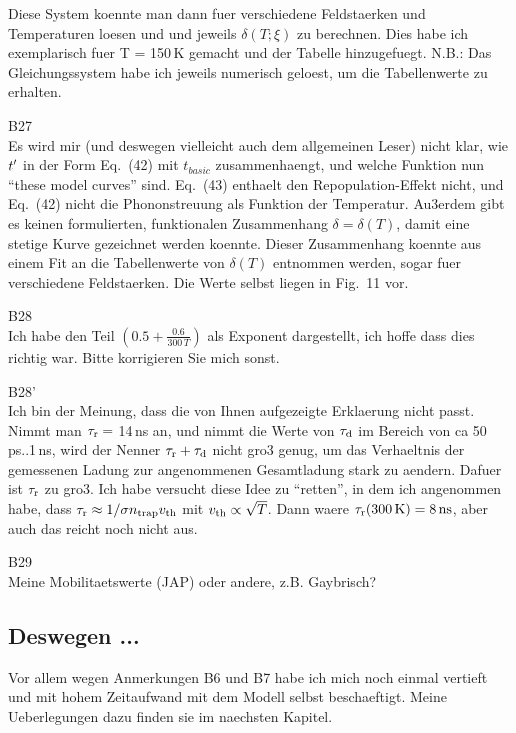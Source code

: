 \noindent
Diese System koennte man dann fuer verschiedene Feldstaerken und Temperaturen loesen und und jeweils $\delta(T;\xi)$ zu berechnen. 
Dies habe ich exemplarisch fuer T = 150\,K gemacht und der Tabelle hinzugefuegt. 
N.B.: Das Gleichungssystem habe ich jeweils numerisch geloest, um die Tabellenwerte zu erhalten. 

B27\\
Es wird mir (und deswegen vielleicht auch dem allgemeinen Leser) nicht klar, wie $\mathnormal{t'}$ in der Form Eq.\ (42) mit $t_{basic}$ zusammenhaengt, und welche Funktion nun ``these model curves'' sind. 
Eq.\ (43) enthaelt den Repopulation-Effekt nicht, und Eq.\ (42) nicht die Phononstreuung als Funktion der Temperatur. 
Au3erdem gibt es keinen formulierten, funktionalen Zusammenhang $\delta = \delta(T)$, damit eine stetige Kurve gezeichnet werden koennte. 
Dieser Zusammenhang koennte aus einem Fit an die Tabellenwerte von $\delta(T)$ entnommen werden, sogar fuer verschiedene Feldstaerken. 
Die Werte selbst liegen in Fig.\ 11 vor. 

B28\\
Ich habe den Teil $\left( 0.5 + \frac{0.6}{300\,T} \right)$ als Exponent dargestellt, ich hoffe dass dies richtig war. Bitte korrigieren Sie mich sonst. 

B28'\\
Ich bin der Meinung, dass die von Ihnen aufgezeigte Erklaerung nicht passt. 
Nimmt man $\tau_\textrm{r} = $ 14\,ns an, und nimmt die Werte von $\tau_{\textrm{d}}$ im Bereich von ca 50\,ps..1\,ns, wird der Nenner $\tau_\textrm{r} + \tau_{\textrm{d}}$ nicht gro3 genug, um das Verhaeltnis der gemessenen Ladung
 zur angenommenen Gesamtladung stark zu aendern.
Dafuer ist $\tau_\textrm{r}$ zu gro3. 
Ich habe versucht diese Idee zu ``retten'', in dem ich angenommen habe, dass $\tau_\textrm{r} \approx 1 / \sigma n_{\textrm{trap}} \mathnormal{v}_{\textrm{th}}$ mit $\mathnormal{v}_{\textrm{th}} \propto \sqrt{T}$. 
Dann waere $\taurec(\SI{300}{\kelvin}) = \SI{8}{\ns}$, aber auch das reicht noch nicht aus. 

B29\\
Meine Mobilitaetswerte (JAP) oder andere, z.B. Gaybrisch?


\subsection{Deswegen ...}
Vor allem wegen Anmerkungen B6 und B7 habe ich mich noch einmal vertieft und mit hohem Zeitaufwand mit dem Modell selbst beschaeftigt.
Meine Ueberlegungen dazu finden sie im naechsten Kapitel.






